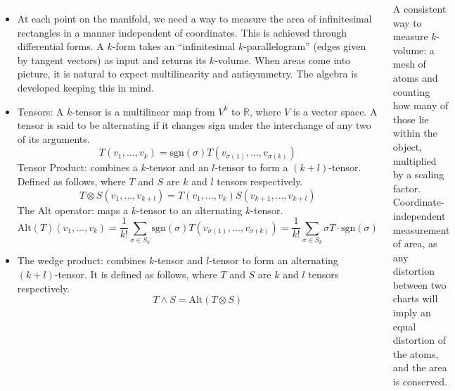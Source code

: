\documentclass[20pt,margin=1in,innermargin=-4.5in,blockverticalspace=-0.25in]{tikzposter}
\begin{document}
\begin{columns}
{\begin{itemize}
            \item At each point on the manifold, we need a way to measure the area of infinitesimal rectangles in a manner independent of coordinates. This is achieved through differential forms. A $k$-form takes an ``infinitesimal $k$-parallelogram'' (edges given by tangent vectors) as input and returns its $k$-volume. When areas come into picture, it is natural to expect multilinearity and antisymmetry. The algebra is developed keeping this in mind. 
            \item Tensors: A $k$-tensor is a multilinear map from $V^k$ to $\mathbb{R}$, where $V$ is a vector space. A tensor is said to be alternating if it changes sign under the interchange of any two of its arguments.
            \[
                T(v_1, \ldots, v_k) = \text{sgn}(\sigma) T(v_{\sigma(1)}, \ldots, v_{\sigma(k)})
            \]
            Tensor Product: combines a $k$-tensor and an $l$-tensor to form a $(k+l)$-tensor. Defined as follows, where $T$ and $S$ are $k$ and $l$ tensors respectively.
            \[
                T \otimes S(v_1, \ldots, v_{k+l}) = T(v_1, \ldots, v_k) S(v_{k+1}, \ldots, v_{k+l})
            \]
            The Alt operator: maps a $k$-tensor to an alternating $k$-tensor.
            \[
                \text{Alt}(T)(v_1, \ldots, v_k) = \frac{1}{k!} \sum_{\sigma \in S_k} \text{sgn}(\sigma) T(v_{\sigma(1)}, \ldots, v_{\sigma(k)}) = \frac{1}{k!} \sum_{\sigma \in S_k} \sigma T \cdot \text{sgn}(\sigma)
            \]
            \item The wedge product: combines $k$-tensor and $l$-tensor to form an alternating $(k+l)$-tensor. It is defined as follows, where $T$ and $S$ are $k$ and $l$ tensors respectively.
            \[
                T \wedge S = \text{Alt}(T \otimes S)
            \]
        \end{itemize}
        A consistent way to measure $k$-volume: a mesh of atoms and counting how many of those lie within the object, multiplied by a scaling factor. Coordinate-independent measurement of area, as any distortion between two charts will imply an equal distortion of the atoms, and the area is conserved.
        }
        

         \block{}{
            
}
\end{columns}
\end{document}
